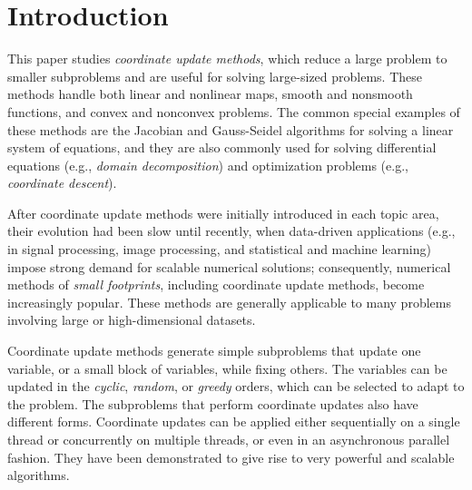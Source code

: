 \section{Introduction}
This paper studies  \emph{coordinate update methods}, which reduce a large problem to smaller subproblems and are useful for solving large-sized problems. These methods handle both  linear and nonlinear maps, smooth and nonsmooth functions, and convex and nonconvex problems. %
The common special examples of these methods are the Jacobian and Gauss-Seidel algorithms for solving a linear system of equations, and they are also commonly used for solving differential equations (e.g., \emph{domain decomposition}) and optimization problems (e.g., \emph{coordinate descent}).

After coordinate update methods were initially introduced in each topic area, their evolution  had been slow until recently, when data-driven applications (e.g., in signal processing,  image processing, and statistical and machine learning) impose strong demand for scalable numerical solutions; consequently,  numerical methods of \emph{small footprints}, including  coordinate update methods, become increasingly popular. These methods are generally applicable to many problems involving large
or high-dimensional datasets.

Coordinate update methods generate simple subproblems that update one variable, or a small block of variables, while fixing others. The variables can be updated in  the \textit{cyclic}, \textit{random}, or \textit{greedy} orders, which can be selected to adapt to the problem. The subproblems that perform coordinate updates also have different forms. %
Coordinate updates can be  applied either sequentially on a single thread or concurrently on multiple threads, or even in an asynchronous parallel fashion. They have been demonstrated to give rise to very powerful and scalable algorithms.


